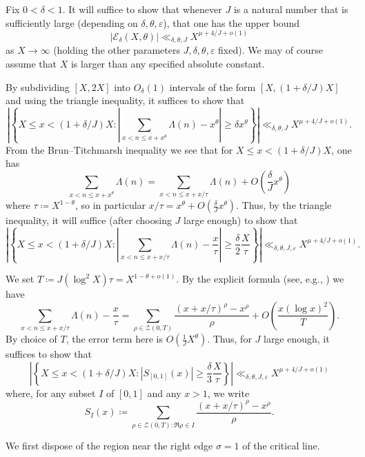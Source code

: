 \documentclass[12pt]{amsart}
\newcommand{\eps}{\varepsilon}
\begin{document}
Fix $0 < \delta < 1$.  It will suffice to show that whenever $J$ is a natural number that is sufficiently large (depending on $\delta, \theta, \eps$), that one has the upper bound
$$|{\mathcal E}_\delta(X,\theta)| \ll_{\delta,\theta,J} X^{\mu+4/J+o(1)}$$
as $X \to \infty$ (holding the other parameters $J,\delta,\theta,\eps$ fixed).  We may of course assume that $X$ is larger than any specified absolute constant.

By subdividing $[X,2X]$ into $O_\delta(1)$ intervals of the form $[X,(1+\delta/J) X]$ and using the triangle inequality, it suffices to show that
$$\left|\left\{ X \leq x < (1+\delta/J) X: \left| \sum_{x < n \leq x + x^\theta} \Lambda(n) - x^\theta \right| \geq \delta x^\theta \right\}\right| \ll_{\delta,\theta,J} X^{\mu+4/J+o(1)}.$$
From the Brun--Titchmarsh inequality we see that for $X \leq x < (1+\delta/J) X$, one has
$$ \sum_{x < n \leq x + x^\theta} \Lambda(n) = \sum_{x < n \leq x + x/\tau} \Lambda(n) + O\left(\frac{\delta}{J} x^\theta\right)$$
where $\tau \coloneqq X^{1-\theta}$, so in particular $x/\tau = x^\theta +  O(\frac{\delta}{J} x^\theta)$.  Thus, by the triangle inequality, it will suffice (after choosing $J$ large enough) to show that
\[
\left| \left\{ X \leq x < (1+\delta/J) X : \left| \sum_{x < n \leq x + x/\tau} \Lambda(n) - \frac{x}{\tau} \right| \geq \frac{\delta}{2} \frac{X}{\tau} \right\} \right| \ll_{\delta,\theta,J,\eps} X^{\mu+4/J+o(1)}.
\]

We set $T \coloneqq J (\log^2 X) \tau = X^{1-\theta+o(1)}$.  By the explicit formula (see, e.g., \cite[Chapter 17]{davenport}) we have
$$ \sum_{x < n \leq x + x/\tau} \Lambda(n) - \frac{x}{\tau} = \sum_{\rho \in {\mathcal Z}(0,T)} \frac{(x+x/\tau)^\rho-x^\rho}{\rho} + O\left( \frac{x (\log x)^2}{T} \right).$$
By choice of $T$, the error term here is $O(\frac{1}{J} X^\theta)$.  Thus, for $J$ large enough, it suffices to show that
\begin{equation}\label{targ}
  \left|\left\{ X \leq x < (1+\delta/J) X: |S_{[0,1]}(x)| \geq \frac{\delta}{3} \frac{X}{\tau} \right\}\right| \ll_{\delta,\theta,J,\eps} X^{\mu+4/J+o(1)}
\end{equation}
where, for any subset $I$ of $[0,1]$ and any $x > 1$, we write
\begin{equation}\label{six}
   S_I(x) \coloneqq \sum_{\rho \in {\mathcal Z}(0,T): \Re \rho \in I} \frac{(x+x/\tau)^\rho-x^\rho}{\rho}.
\end{equation}

We first dispose of the region near the right edge $\sigma=1$ of the critical line.
\end{document}
